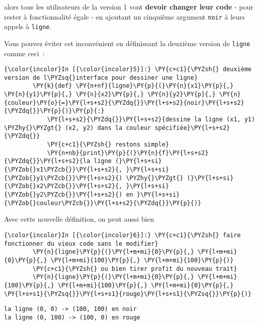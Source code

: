 alors tous les utilisateurs de la version 1 vont \textbf{devoir changer
leur code} - pour rester à fonctionnalité égale - en ajoutant un
cinquième argument \texttt{\textquotesingle{}noir\textquotesingle{}} à
leurs appels à \texttt{ligne}.

    Vous pouvez éviter cet inconvénient en définissant la deuxième version
de \texttt{ligne} comme ceci~:

    \begin{Verbatim}[commandchars=\\\{\}]
{\color{incolor}In [{\color{incolor}5}]:} \PY{c+c1}{\PYZsh{} deuxième version de l\PYZsq{}interface pour dessiner une ligne}
        \PY{k}{def} \PY{n+nf}{ligne}\PY{p}{(}\PY{n}{x1}\PY{p}{,} \PY{n}{y1}\PY{p}{,} \PY{n}{x2}\PY{p}{,} \PY{n}{y2}\PY{p}{,} \PY{n}{couleur}\PY{o}{=}\PY{l+s+s2}{\PYZdq{}}\PY{l+s+s2}{noir}\PY{l+s+s2}{\PYZdq{}}\PY{p}{)}\PY{p}{:}
            \PY{l+s+s2}{\PYZdq{}}\PY{l+s+s2}{dessine la ligne (x1, y1) \PYZhy{}\PYZgt{} (x2, y2) dans la couleur spécifiée}\PY{l+s+s2}{\PYZdq{}}
            \PY{c+c1}{\PYZsh{} restons simple}
            \PY{n+nb}{print}\PY{p}{(}\PY{n}{f}\PY{l+s+s2}{\PYZdq{}}\PY{l+s+s2}{la ligne (}\PY{l+s+si}{\PYZob{}x1\PYZcb{}}\PY{l+s+s2}{, }\PY{l+s+si}{\PYZob{}y1\PYZcb{}}\PY{l+s+s2}{) \PYZhy{}\PYZgt{} (}\PY{l+s+si}{\PYZob{}x2\PYZcb{}}\PY{l+s+s2}{, }\PY{l+s+si}{\PYZob{}y2\PYZcb{}}\PY{l+s+s2}{) en }\PY{l+s+si}{\PYZob{}couleur\PYZcb{}}\PY{l+s+s2}{\PYZdq{}}\PY{p}{)}
\end{Verbatim}


    Avec cette nouvelle définition, on peut aussi bien

    \begin{Verbatim}[commandchars=\\\{\}]
{\color{incolor}In [{\color{incolor}6}]:} \PY{c+c1}{\PYZsh{} faire fonctionner du vieux code sans le modifier}
        \PY{n}{ligne}\PY{p}{(}\PY{l+m+mi}{0}\PY{p}{,} \PY{l+m+mi}{0}\PY{p}{,} \PY{l+m+mi}{100}\PY{p}{,} \PY{l+m+mi}{100}\PY{p}{)}
        \PY{c+c1}{\PYZsh{} ou bien tirer profit du nouveau trait}
        \PY{n}{ligne}\PY{p}{(}\PY{l+m+mi}{0}\PY{p}{,} \PY{l+m+mi}{100}\PY{p}{,} \PY{l+m+mi}{100}\PY{p}{,} \PY{l+m+mi}{0}\PY{p}{,} \PY{l+s+s1}{\PYZsq{}}\PY{l+s+s1}{rouge}\PY{l+s+s1}{\PYZsq{}}\PY{p}{)}
\end{Verbatim}


    \begin{Verbatim}[commandchars=\\\{\}]
la ligne (0, 0) -> (100, 100) en noir
la ligne (0, 100) -> (100, 0) en rouge

    \end{Verbatim}

